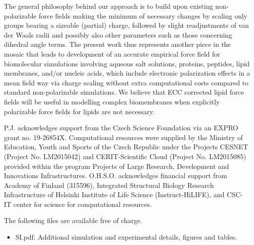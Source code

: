 \documentclass[journal=jctcce,manuscript=article]{achemso}
\begin{document}
The general philosophy behind our approach is to build upon existing non-polarizable force fields making the minimum of necessary changes by scaling only groups bearing a sizeable (partial) charge, followed by slight readjustments of van der Waals radii and possibly also other parameters such as those concerning dihedral angle terms.
The present work thus represents another piece in the mosaic that leads to development of an accurate empirical force field for biomolecular simulations involving aqueous salt solutions, proteins, peptides, lipid membranes, and/or nucleic acids, which include electronic polarization effects in a mean field way via charge scaling without extra computational costs compared to standard non-polarizable simulations. 
We believe that ECC corrected lipid force fields will be useful in modelling complex biomembranes when 
explicitly polarizable force fields for lipids \cite{li17,chu18} are not necessary.

\begin{acknowledgement} 
P.J. acknowledges support from the Czech Science Foundation via an EXPRO grant no. 19-26854X. 
Computational resources were supplied by the Ministry of Education, Youth and Sports 
of the Czech Republic under the Projects CESNET (Project No. LM2015042) and CERIT-Scientific 
Cloud (Project No. LM2015085) provided within the program Projects of Large Research, 
Development and Innovations Infrastructures. 
O.H.S.O. acknowledges financial support from Academy of Finland (315596),
Integrated Structural Biology Research Infrastructure of
Helsinki Institute of Life Science (Instruct-HiLIFE), and
CSC-IT center for science for computational resources.
\end{acknowledgement} 
 
\begin{suppinfo} 
 
 
The following files are available free of charge. 
\begin{itemize} 
  \item SI.pdf: Additional simulation and experimental details, figures and tables. 
\end{itemize} 
 
\end{suppinfo} 
 
 
 
 
\end{document}
